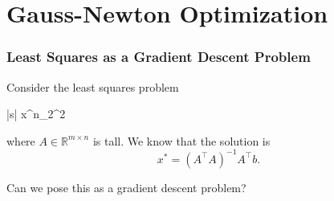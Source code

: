 \documentclass{beamer}
\begin{document}
%	
%	
%	
%
%	

\section{Gauss-Newton Optimization}
\frame{\sectionpage}

\begin{frame}\frametitle{Least Squares as a Gradient Descent Problem}
Consider the least squares problem
	\begin{mini*}|s|
		{x\in{}^n}{_2^2}{}{}
	\end{mini*}
where $A\in\mathbb{R}^{m\times n}$ is tall.  We know that the solution is
\[
x^\ast = (A^\top A)^{-1} A^\top b.
\]

Can we pose this as a gradient descent problem?
\end{frame}
\end{document}
